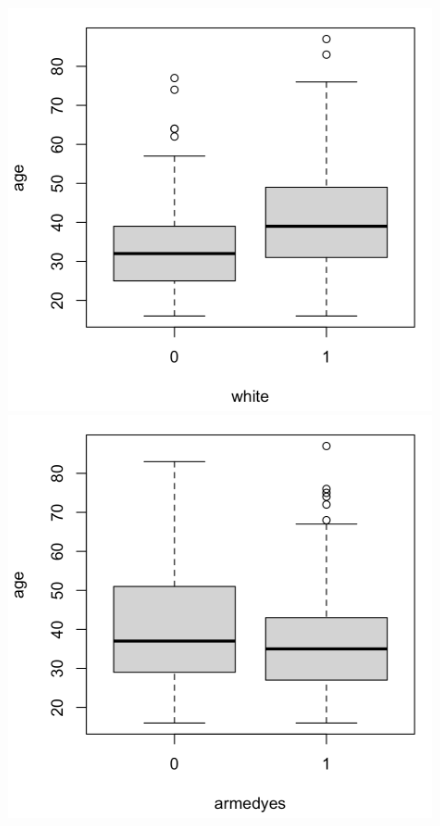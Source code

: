 \begin{figure}[h]
    \centering
    \includegraphics[scale=.3]{boxplot_age_white.png}
    \includegraphics[scale=.3]{boxplot_age_armedyes.png}

\end{figure}
